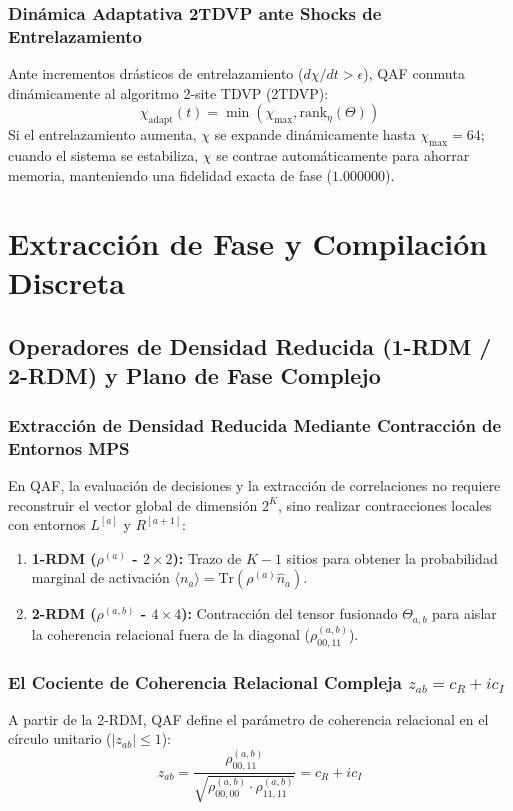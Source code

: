 \documentclass[11pt,a4paper,oneside]{report}
\begin{document}
\section{Dinámica Adaptativa 2TDVP ante Shocks de Entrelazamiento}
Ante incrementos drásticos de entrelazamiento ($d\chi/dt > \epsilon$), QAF conmuta dinámicamente al algoritmo 2-site TDVP (2TDVP):
\begin{equation}
\chi_{\text{adapt}}(t) = \min\left(\chi_{\text{max}}, \text{rank}_\eta(\Theta)\right)
\end{equation}
Si el entrelazamiento aumenta, $\chi$ se expande dinámicamente hasta $\chi_{\text{max}} = 64$; cuando el sistema se estabiliza, $\chi$ se contrae automáticamente para ahorrar memoria, manteniendo una fidelidad exacta de fase ($1.000000$).


\part{Extracción de Fase y Compilación Discreta}

\chapter{Operadores de Densidad Reducida (1-RDM / 2-RDM) y Plano de Fase Complejo}
\label{cap:rdm_plano_fase}

\section{Extracción de Densidad Reducida Mediante Contracción de Entornos MPS}
En QAF, la evaluación de decisiones y la extracción de correlaciones no requiere reconstruir el vector global de dimensión $2^K$, sino realizar contracciones locales con entornos $L^{[a]}$ y $R^{[a+1]}$:
\begin{enumerate}
    \item \textbf{1-RDM ($\rho^{(a)}$ - $2 \times 2$):} Trazo de $K-1$ sitios para obtener la probabilidad marginal de activación $\langle n_a \rangle = \text{Tr}(\rho^{(a)} \hat{n}_a)$.
    \item \textbf{2-RDM ($\rho^{(a,b)}$ - $4 \times 4$):} Contracción del tensor fusionado $\Theta_{a,b}$ para aislar la coherencia relacional fuera de la diagonal ($\rho^{(a,b)}_{00,11}$).
\end{enumerate}

\section{El Cociente de Coherencia Relacional Compleja $z_{ab} = c_R + i c_I$}
A partir de la 2-RDM, QAF define el parámetro de coherencia relacional en el círculo unitario ($|z_{ab}| \le 1$):
\begin{equation}
z_{ab} = \frac{\rho^{(a,b)}_{00,11}}{\sqrt{\rho^{(a,b)}_{00,00} \cdot \rho^{(a,b)}_{11,11}}} = c_R + i c_I
\end{equation}
\end{document}

